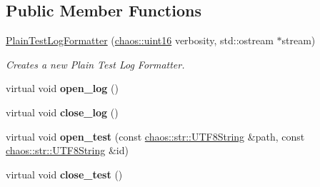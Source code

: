 \subsection*{Public Member Functions}
\begin{DoxyCompactItemize}
\item 
\hypertarget{classchaos_1_1test_1_1log__formatter_1_1_plain_test_log_formatter_a96214486917fda902ddaef37342c0ad8}{\hyperlink{classchaos_1_1test_1_1log__formatter_1_1_plain_test_log_formatter_a96214486917fda902ddaef37342c0ad8}{Plain\-Test\-Log\-Formatter} (\hyperlink{namespacechaos_ac3888b1c9e56da7fbbdb3ab8425b4068}{chaos\-::uint16} verbosity, std\-::ostream $\ast$stream)}\label{classchaos_1_1test_1_1log__formatter_1_1_plain_test_log_formatter_a96214486917fda902ddaef37342c0ad8}

\begin{DoxyCompactList}\small\item\em Creates a new Plain Test Log Formatter. \end{DoxyCompactList}\item 
\hypertarget{classchaos_1_1test_1_1log__formatter_1_1_plain_test_log_formatter_abdf1f9a1a7099f1af520b6dcc9c344b1}{virtual void {\bfseries open\-\_\-log} ()}\label{classchaos_1_1test_1_1log__formatter_1_1_plain_test_log_formatter_abdf1f9a1a7099f1af520b6dcc9c344b1}

\item 
\hypertarget{classchaos_1_1test_1_1log__formatter_1_1_plain_test_log_formatter_ad16ae535433e998b2af10ec0a2af329f}{virtual void {\bfseries close\-\_\-log} ()}\label{classchaos_1_1test_1_1log__formatter_1_1_plain_test_log_formatter_ad16ae535433e998b2af10ec0a2af329f}

\item 
\hypertarget{classchaos_1_1test_1_1log__formatter_1_1_plain_test_log_formatter_ae1e5cce2f2e5407cd619855c3daf18a8}{virtual void {\bfseries open\-\_\-test} (const \hyperlink{classchaos_1_1str_1_1_u_t_f8_string}{chaos\-::str\-::\-U\-T\-F8\-String} \&path, const \hyperlink{classchaos_1_1str_1_1_u_t_f8_string}{chaos\-::str\-::\-U\-T\-F8\-String} \&id)}\label{classchaos_1_1test_1_1log__formatter_1_1_plain_test_log_formatter_ae1e5cce2f2e5407cd619855c3daf18a8}

\item 
\hypertarget{classchaos_1_1test_1_1log__formatter_1_1_plain_test_log_formatter_aa6ff58563cec81e203461286504612f3}{virtual void {\bfseries close\-\_\-test} ()}\label{classchaos_1_1test_1_1log__formatter_1_1_plain_test_log_formatter_aa6ff58563cec81e203461286504612f3}


\end{DoxyCompactItemize}
